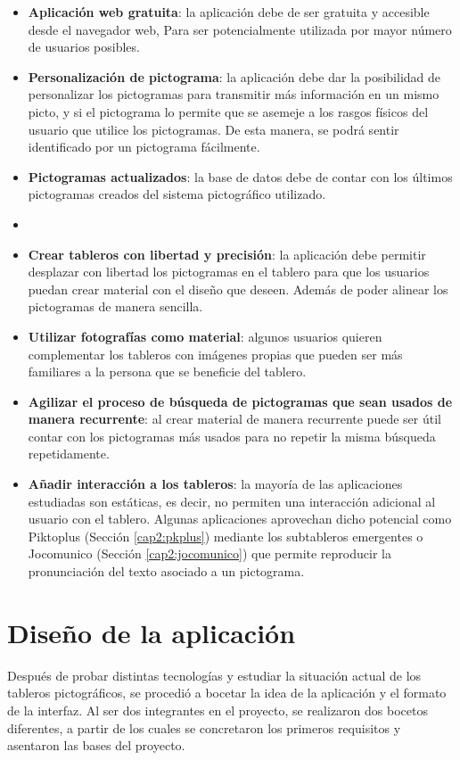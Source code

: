 \begin{itemize}
	
	\item \textbf{Aplicación web gratuita}: la aplicación debe de ser gratuita y accesible desde el navegador web, Para ser potencialmente utilizada por mayor número de usuarios posibles.
	\item \textbf{Personalización de pictograma}: la aplicación debe dar la posibilidad de personalizar los pictogramas para transmitir más información en un mismo picto, y si el pictograma lo permite que se asemeje a los rasgos físicos del usuario que utilice los pictogramas. De esta manera, se podrá sentir identificado por un pictograma fácilmente. 
	\item \textbf{Pictogramas actualizados}: la base de datos debe de contar con los últimos pictogramas creados del sistema pictográfico utilizado. 
	\item 
	\item \textbf{Crear tableros con libertad y precisión}: la aplicación debe permitir desplazar con libertad los pictogramas en el tablero para que los usuarios puedan crear material con el diseño que deseen. Además de poder alinear los pictogramas de manera sencilla.  
	\item \textbf{Utilizar fotografías como material}: algunos usuarios quieren complementar los tableros con imágenes propias que pueden ser más familiares a la persona que se beneficie del tablero. 
	\item \textbf{Agilizar el proceso de búsqueda de pictogramas que sean usados de manera recurrente}: al crear material de manera recurrente puede ser útil contar con los pictogramas más usados para no repetir la misma búsqueda repetidamente. 
	\item \textbf{Añadir interacción a los tableros}: la mayoría de las aplicaciones estudiadas son estáticas, es decir, no permiten una interacción adicional al usuario con el tablero. Algunas aplicaciones aprovechan dicho potencial como Piktoplus (Sección \ref{cap2:pkplus}) mediante los subtableros emergentes o Jocomunico (Sección \ref{cap2:jocomunico}) que permite reproducir la pronunciación del texto asociado a un pictograma.
	
\end{itemize}






\section{Diseño de la aplicación}
\label{cap4:diseñoapp}
Después de probar distintas tecnologías y estudiar la situación actual de los tableros pictográficos, se procedió a bocetar la idea de la aplicación y el formato de la interfaz. Al ser dos integrantes en el proyecto, se realizaron dos bocetos diferentes, a partir de los cuales se concretaron los primeros requisitos y asentaron las bases del proyecto.


